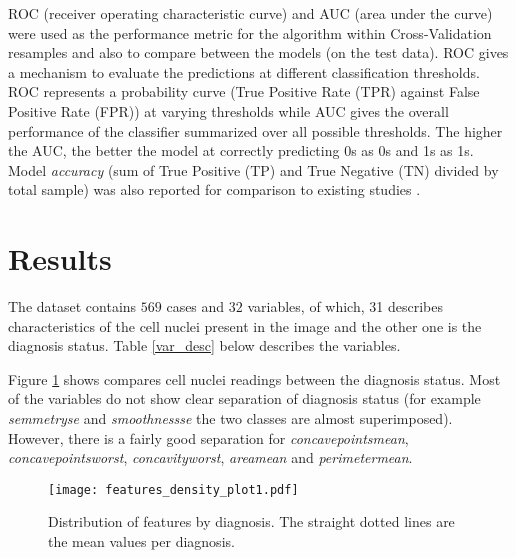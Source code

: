 \noindent ROC (receiver operating characteristic curve) and AUC (area under the curve) were used as the performance metric for the algorithm within Cross-Validation resamples and also to compare between the models (on the test data). ROC gives a mechanism to evaluate the predictions at different classification thresholds. ROC represents a probability curve (True Positive Rate (TPR) against False Positive Rate (FPR)) at varying thresholds while AUC gives the overall performance of the classifier summarized over all possible thresholds. The higher the AUC, the better the model at correctly predicting 0s as 0s and 1s as 1s. Model \textit{accuracy} (sum of True Positive (TP) and True Negative (TN) divided by total sample) was also reported for comparison to existing studies \citep{james2013introduction}.

\clearpage

\section{Results}

The dataset contains $569$ cases and $32$ variables, of which, 31 describes characteristics of the cell nuclei present in the image and the other one is the diagnosis status. Table \ref{var_desc} below describes the variables.
\vspace*{-10pt}
\begin{table}[H]
\centering
\caption{\small{Variables description and summary}}\vspace{-0.3cm}
\end{table}
\vspace*{-12pt}

\noindent Figure \ref{fig:features} shows compares cell nuclei readings between the diagnosis status.  Most of the variables do not show clear separation of diagnosis status (for example \textit{semmetryse} and \textit{smoothnessse} the two classes are almost superimposed). However, there is a fairly good separation for \textit{concavepointsmean}, \textit{concavepointsworst}, \textit{concavityworst}, \textit{areamean} and \textit{perimetermean}.

\noindent\begin{figure}[H]
    \centering
    \texttt{[image: features\_density\_plot1.pdf]}\vspace{-0.3cm}
    \caption{\small{Distribution of features by diagnosis. The straight dotted lines are the mean values per diagnosis.}}\label{fig:features}
\end{figure}

\clearpage


\newpage
%



